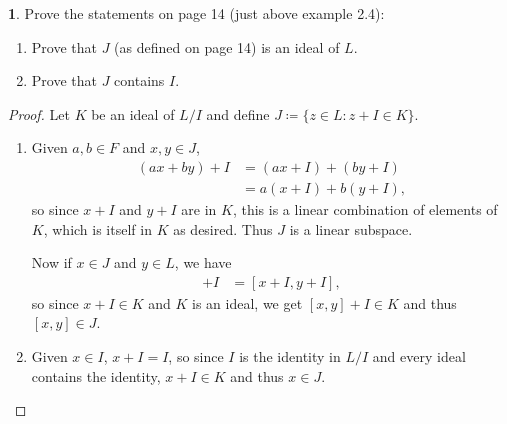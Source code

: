 \documentclass[12pt]{article}
\theoremstyle{definition}
\newtheorem{ex}{}
\begin{document}
\begin{ex}
	Prove the statements on page 14 (just above example 2.4): \begin{enumerate}[label=(\alph*)]
		\item Prove that $J$ (as defined on page 14) is an ideal of $L$.
		\item Prove that $J$ contains $I$.
	\end{enumerate}
\end{ex}
\begin{proof}
	Let $K$ be an ideal of $L/I$ and define $J \coloneq \lbrace z \in L : z + I \in K \rbrace$.
	\begin{enumerate}[label=(\alph*)]
		\item Given $a, b \in F$ and $x, y \in J$, \begin{align*}
			      (ax + by) + I & = (ax + I) + (by + I)  \\
			                    & = a(x + I) + b(y + I),
		      \end{align*}
		      so since $x + I$ and $y + I$ are in $K$, this is a linear combination of elements of $K$, which is itself in $K$ as desired.
		      Thus $J$ is a linear subspace.

		      Now if $x \in J$ and $y \in L$, we have \begin{align*}
			      [x, y] + I & = [x + I, y + I],
		      \end{align*}
		      so since $x + I \in K$ and $K$ is an ideal, we get $[x, y] + I \in K$ and thus $[x, y] \in J$.
		\item Given $x \in I$, $x + I = I$, so since $I$ is the identity in $L/I$ and every ideal contains the identity, $x + I \in K$ and thus $x \in J$.
	\end{enumerate}
\end{proof}
\end{document}
